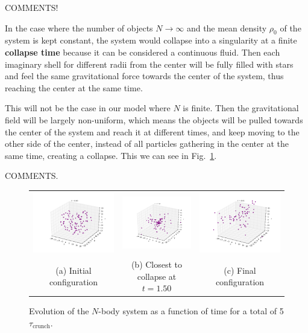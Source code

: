 \documentclass{article}
\begin{document}
\begin{multicols}{2}
COMMENTS!

In the case where the number of objects $N \rightarrow \infty$ and the mean density $\rho_0$ of the system is kept constant, the system would collapse into a singularity at a finite \textbf{collapse time} because it can be considered a continuous fluid. Then each imaginary shell for different radii from the center will be fully filled with stars and feel the same gravitational force towards the center of the system, thus reaching the center at the same time. 

This will not be the case in our model where $N$ is finite. Then the gravitational field will be largely non-uniform, which means the objects will be pulled towards the center of the system and reach it at different times, and keep moving to the other side of the center, instead of all particles gathering in the center at the same time, creating a collapse. This we can see in Fig.~\ref{fig:N_body_simulation}.

COMMENTS.

\begin{figure}
\begin{center}
\begin{tabular}{ccc}
  	\includegraphics[width=60mm]{Images/Image_100_000.png}
	& \includegraphics[width=60mm]{Images/Image_100_150.png}
	& \includegraphics[width=60mm]{Images/Image_100_495.png} \\
	(a) Initial configuration				& (b) Closest to collapse at $t = 1.50$ 	& (c) Final configuration \\[6pt]
\end{tabular}
\caption{Evolution of the $N$-body system as a function of time for a total of 5$\tau_{\mathrm{crunch}}$.}\label{fig:N_body_simulation}
\end{center}
\end{figure}



\end{multicols}
\end{document}

